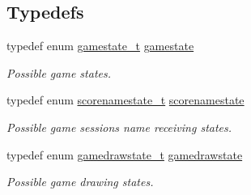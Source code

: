 \subsection*{Typedefs}
\begin{DoxyCompactItemize}
\item 
\hypertarget{group__game_ga33d4db650f69082296cc8c864c785e15}{}\label{group__game_ga33d4db650f69082296cc8c864c785e15} 
typedef enum \hyperlink{group__game_gaa3df7fce134ae5843a2bd6cdcd5796d0}{gamestate\+\_\+t} \hyperlink{group__game_ga33d4db650f69082296cc8c864c785e15}{gamestate}
\begin{DoxyCompactList}\small\item\em Possible game states. \end{DoxyCompactList}\item 
\hypertarget{group__game_ga74f568c551e9db616e8fae5ed65be48d}{}\label{group__game_ga74f568c551e9db616e8fae5ed65be48d} 
typedef enum \hyperlink{group__game_gab8e853703f9cb99b52ba53bcf16b5c4a}{scorenamestate\+\_\+t} \hyperlink{group__game_ga74f568c551e9db616e8fae5ed65be48d}{scorenamestate}
\begin{DoxyCompactList}\small\item\em Possible game session\textquotesingle{}s name receiving states. \end{DoxyCompactList}\item 
\hypertarget{group__game_gab1e4078b5fa77cbf79de5e160f4cb261}{}\label{group__game_gab1e4078b5fa77cbf79de5e160f4cb261} 
typedef enum \hyperlink{group__game_ga9984788ca86b30e008e68a755caeb998}{gamedrawstate\+\_\+t} \hyperlink{group__game_gab1e4078b5fa77cbf79de5e160f4cb261}{gamedrawstate}
\begin{DoxyCompactList}\small\item\em Possible game drawing states. \end{DoxyCompactList}\end{DoxyCompactItemize}
